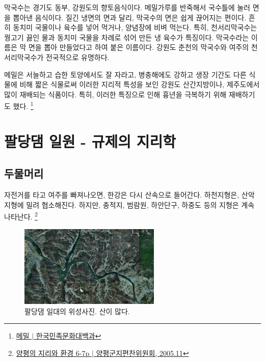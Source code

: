 막국수는 경기도 동부, 강원도의 향토음식이다. 메밀가루를 반죽해서 국수틀에 눌러 면을 뽑아낸 음식이다.
질긴 냉면의 면과 달리, 막국수의 면은 쉽게 끊어지는 편이다.
흔히 동치미 국물이나 육수를 넣어 먹거나, 양념장에 비벼 먹는다.
특히, 천서리막국수는 꿩고기 끓인 물과 동치미 국물을 차례로 섞어 만든 냉 육수가 특징이다.
막국수라는 이름은 막 면을 뽑아 만들었다고 하여 붙은 이름이다.
강원도 춘천의 막국수와 여주의 천서리막국수가 전국적으로 유명하다.


메밀은 서늘하고 습한 토양에서도 잘 자라고, 병충해에도 강하고 생장 기간도 다른 식물에 비해 짧은 식물로써
이러한 지리적 특성을 보인 강원도 산간지방이나, 제주도에서 많이 재배되는 식품이다. 특히, 이러한 특징으로 인해
흉년을 극복하기 위해 재배하기도 했다.
\footnote{\href{https://terms.naver.com/entry.naver?docId=545707&cid=46640&categoryId=46640}{메밀 $|$ 한국민족문화대백과}}


\section{팔당댐 일원 - 규제의 지리학}
\subsection{두물머리}
자전거를 타고 여주를 빠져나오면, 한강은 다시 산속으로 들어간다. 
하천지형은, 산악지형에 밀려 협소해진다. 하지만, 충적지, 범람원, 하안단구, 하중도 등의 지형은 계속 나타난다.
\footnote{\href{https://memory.library.kr/items/show/28910}{양평의 지리와 환경 6-7p $|$ 양평군지편찬위원회, 2005.11}}


\begin{figure}[ht]
    \centering
    \includegraphics[width=0.6\textwidth]{img/팔당호지도.jpg}
    \caption{팔당댐 일대의 위성사진. 산이 많다.\protect\footnotemark}
    \label{fig:my_label8}
\end{figure}


